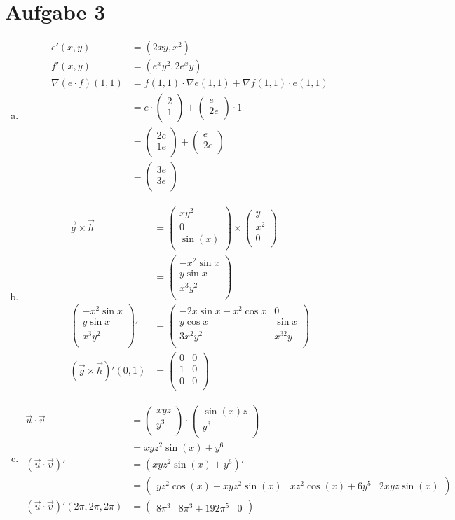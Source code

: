\documentclass[10pt,a4paper,parskip=half]{scrartcl}
\newcommand{\vectwo}[2]{\begin{pmatrix}#1\\#2\\\end {pmatrix}}
\newcommand{\vecthree}[3]{\begin{pmatrix}#1\\#2\\#3\\\end {pmatrix}}
\begin{document}
\section*{Aufgabe 3}
\begin{enumerate}[(a)]
\item
\begin{align*}
e'(x,y) &= (2xy,x^2) \\
f'(x,y) &= (e^xy^2,2e^xy) \\
\nabla(e\cdot f)(1,1) &= f(1,1) \cdot \nabla e(1,1) + \nabla  f(1,1) \cdot e(1,1) \\
&= e \cdot \vectwo{2}{1} + \vectwo{e}{2e} \cdot 1 \\
&= \vectwo{2e}{1e} + \vectwo{e}{2e} \\
&= \vectwo{3e}{3e}
\end{align*}

\item
\begin{align*}
\vec g \times \vec h &= \vecthree{xy^2}{0}{\sin (x)} \times \vecthree{y}{x^2}{0} \\
&= \vecthree{-x^2 \sin x}{y\sin x}{x^3y^2} \\
\vecthree{-x^2 \sin x}{y \sin x}{x^3y^2}' &= 
\begin{pmatrix}
-2x \sin x - x^2 \cos x& 0 \\
y \cos x & \sin x \\
3x^2y^2 & x^32y\\
\end{pmatrix}\\
(\vec g \times \vec h)'(0,1) &= \begin{pmatrix}
0 & 0 \\
1 & 0 \\
0 & 0 \\
\end{pmatrix}
\end{align*}
\item
\begin{align*}
\vec u \cdot \vec v &= \vectwo{xyz}{y^3} \cdot \vectwo{\sin(x)z}{y^3} \\
&= xyz^2\sin(x) + y^6 \\
(\vec u \cdot \vec v)' &= (xyz^2\sin(x) + y^6)' \\
&= \begin{pmatrix}
yz^2\cos(x) - xyz^2\sin(x) & xz^2\cos(x) + 6y^5 & 2xyz\sin(x)
\end{pmatrix} \\
(\vec u \cdot \vec v)'(2\pi, 2\pi, 2\pi) &= \begin{pmatrix}8\pi^3  & 8\pi^3 + 192 \pi^5 & 0\end{pmatrix}
\end{align*}
\end{enumerate}
\end{document}
